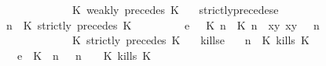 \begin{isabellebody}
\ \ \ \ \ \ \ \ \ \ \ \ {\isasymturnstile}\ {\isasymPsi}\ {\isasymtriangleright}\ {\isacharparenleft}{\isacharparenleft}K\ weakly\ precedes\ K\ {\isacharhash}\ {\isasymPhi}{\isacharparenright}{\isacharparenright}{\isacartoucheclose}\isanewline
{\isacharbar}\ strictly{\isacharunderscore}precedes{\isacharunderscore}e{\isacharcolon}\isanewline
%
\isanewline
\ \ {\isacartoucheopen}{\isacharparenleft}{\isasymGamma}{\isacharcomma}\ n\ {\isasymturnstile}\ {\isacharparenleft}{\isacharparenleft}K\ strictly\ precedes\ K\ {\isacharhash}\ {\isasymPsi}{\isacharparenright}\ {\isasymtriangleright}\ {\isasymPhi}{\isacharparenright}\isanewline
\ \ \ \ \ {\isasymhookrightarrow}\isactrlsub e\ \ {\isacharparenleft}{\isacharparenleft}{\isacharparenleft}{\isasymlceil}{\isacharhash}\isactrlsup {\isasymle}\ K\ n{\isacharcomma}\ {\isacharhash}\isactrlsup {\isacharless}\ K\ n{\isasymrceil}\ {\isasymin}\ {\isacharparenleft}{\isasymlambda}{\isacharparenleft}x{\isacharcomma}y{\isacharparenright}{\isachardot}\ x{\isasymle}y{\isacharparenright}{\isacharparenright}\ {\isacharhash}\ {\isasymGamma}{\isacharparenright}{\isacharcomma}\ n\isanewline
\ \ \ \ \ \ \ \ \ \ \ \ {\isasymturnstile}\ {\isasymPsi}\ {\isasymtriangleright}\ {\isacharparenleft}{\isacharparenleft}K\ strictly\ precedes\ K\ {\isacharhash}\ {\isasymPhi}{\isacharparenright}{\isacharparenright}{\isacartoucheclose}\isanewline
{\isacharbar}\ kills{\isacharunderscore}e{}{\isacharcolon}\isanewline
%
\isanewline
\ \ {\isacartoucheopen}{\isacharparenleft}{\isasymGamma}{\isacharcomma}\ n\ {\isasymturnstile}\ {\isacharparenleft}{\isacharparenleft}K\ kills\ K\ {\isacharhash}\ {\isasymPsi}{\isacharparenright}\ {\isasymtriangleright}\ {\isasymPhi}{\isacharparenright}\isanewline
\ \ \ \ \ {\isasymhookrightarrow}\isactrlsub e\ \ {\isacharparenleft}{\isacharparenleft}{\isacharparenleft}K\ {\isasymnot}{\isasymUp}\ n{\isacharparenright}\ {\isacharhash}\ {\isasymGamma}{\isacharparenright}{\isacharcomma}\ n\ {\isasymturnstile}\ {\isasymPsi}\ {\isasymtriangleright}\ {\isacharparenleft}{\isacharparenleft}K\ kills\ K\ {\isacharhash}\ {\isasymPhi}{\isacharparenright}{\isacharparenright}{\isacartoucheclose}\isanewline

\end{isabellebody}
